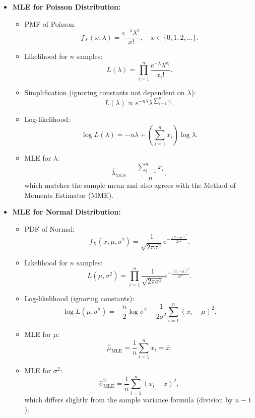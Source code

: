 \documentclass{article}
\begin{document}
\begin{itemize}
  \item \textbf{MLE for Poisson Distribution:}
    \begin{itemize}
      \item PMF of Poisson:
        \[
          f_X(x; \lambda) = \frac{e^{-\lambda} \lambda^x}{x!}, \quad x \in \{0, 1, 2, \dots\}.
        \]
      \item Likelihood for $n$ samples:
        \[
          L(\lambda) = \prod_{i=1}^n \frac{e^{-\lambda} \lambda^{x_i}}{x_i!}.
        \]
      \item Simplification (ignoring constants not dependent on $\lambda$):
        \[
          L(\lambda) \propto e^{-n\lambda} \lambda^{\sum_{i=1}^n x_i}.
        \]
      \item Log-likelihood:
        \[
          \log L(\lambda) = -n\lambda + \left(\sum_{i=1}^n x_i\right) \log \lambda.
        \]
      \item MLE for $\lambda$:
        \[
          \hat{\lambda}_{\text{MLE}} = \frac{\sum_{i=1}^n x_i}{n},
        \]
        which matches the sample mean and also agrees with the Method of Moments Estimator (MME).
    \end{itemize}

  \item \textbf{MLE for Normal Distribution:}
    \begin{itemize}
      \item PDF of Normal:
        \[
          f_X(x; \mu, \sigma^2) = \frac{1}{\sqrt{2\pi\sigma^2}} e^{-\frac{(x-\mu)^2}{2\sigma^2}}.
        \]
      \item Likelihood for $n$ samples:
        \[
          L(\mu, \sigma^2) = \prod_{i=1}^n \frac{1}{\sqrt{2\pi\sigma^2}} e^{-\frac{(x_i-\mu)^2}{2\sigma^2}}.
        \]
      \item Log-likelihood (ignoring constants):
        \[
          \log L(\mu, \sigma^2) = -\frac{n}{2} \log \sigma^2 - \frac{1}{2\sigma^2} \sum_{i=1}^n (x_i - \mu)^2.
        \]
      \item MLE for $\mu$:
        \[
          \hat{\mu}_{\text{MLE}} = \frac{1}{n} \sum_{i=1}^n x_i = \bar{x}.
        \]
      \item MLE for $\sigma^2$:
        \[
          \hat{\sigma}^2_{\text{MLE}} = \frac{1}{n} \sum_{i=1}^n (x_i - \bar{x})^2,
        \]
        which differs slightly from the sample variance formula (division by $n-1$).
    \end{itemize}


\end{itemize}
\end{document}
